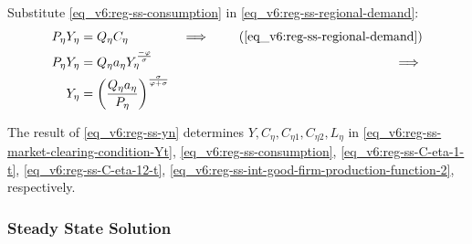 \documentclass[../thesis.tex]{subfiles}
\begin{document}
\begin{comment}
Substitute \ref{eq_v6:reg-ss-C21} in \ref{eq_v6:reg-ss-C22}:
\begin{align}
	C_{22} &= C_{21} \left( \frac{1 - \omega_{21}}{\omega_{21} \theta_{P}} \right) = C_{2} \left( \frac{\omega_{21} \theta_{P}}{1 - \omega_{21}} \right)^{1 - \omega_{21}} \left( \frac{1 - \omega_{21}}{\omega_{21} \theta_{P}} \right) \tag{\ref{eq_v6:reg-ss-C22}} \implies \\
	C_{22} &= C_{2} b_{2}^{\omega_{21}} \label{eq_v6:reg-ss-C22-b}
\end{align}
	
\end{comment}




Substitute \ref{eq_v6:reg-ss-consumption} in \ref{eq_v6:reg-ss-regional-demand}:
	\begin{alignat}{2}
		P_{\eta} Y_{\eta} &= Q_{\eta} C_{\eta} &\implies \tag{\ref{eq_v6:reg-ss-regional-demand}} \\
		P_{\eta} Y_{\eta} &= Q_{\eta} a_{\eta} Y_{\eta}^{\frac{-\varphi}{\sigma}} &\implies \nonumber \\
		Y_{\eta} &= \left( \frac{Q_{\eta} a_{\eta}}{P_{\eta}} \right)^{\frac{\sigma}{\varphi + \sigma}} \label{eq_v6:reg-ss-yn}
	\end{alignat}



	The result of \ref{eq_v6:reg-ss-yn} determines $Y, C_{\eta}, C_{\eta 1}, C_{\eta 2}, L_{\eta}$ in 
	\ref{eq_v6:reg-ss-market-clearing-condition-Yt}, 
	\ref{eq_v6:reg-ss-consumption}, 
	\ref{eq_v6:reg-ss-C-eta-1-t}, 
	\ref{eq_v6:reg-ss-C-eta-12-t}, 
	\ref{eq_v6:reg-ss-int-good-firm-production-function-2}, respectively.


	
	
	\subsubsection{Steady State Solution}
	
	\vspace*{-1cm}
\end{document}
